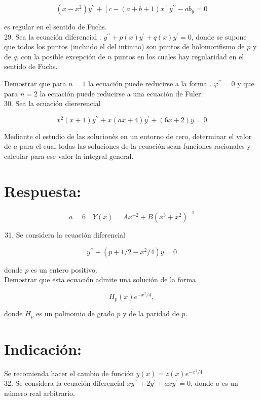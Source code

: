 \documentclass[10pt]{article}
\theoremstyle{plain}
\theoremstyle{definition}
\theoremstyle{remark}
\begin{document}
$$
\left(x-x^{2}\right) y^{\prime \prime}+[c-(a+b+1) x] y^{\prime \prime}-a b_{y}=0
$$

es regular en el sentido de Fuchs.\\
29. Sea la ecuación diferencial . $y^{\prime \prime}+p(x) y^{\prime}+q(x) y^{\prime}=0$, donde se supone que todos los puntos (incluido el del intinito) son puntos de holomorifismo de $p$ y de $q$, con la posible excepción de $n$ puntos en los cuales hay regularidad en el sentido de Fuchs.

Demostrar que para $n=1$ la ecuación puede reducirse a la forma . $\varphi^{\prime \prime}=0$ y que para $n=2$ la ecuación puede reducirse a una ecuación de Fuler.\\
30. Sea la ecuación diererencial

$$
x^{2}(x+1) y^{\prime \prime}+x(a x+4) y^{\prime}+(6 x+2) y=0
$$

Mediante el estudio de las solucionès en un entorno de cero, determinar el valor de $a$ para el cual todas las soluciones de la ecuación sean funciones racionales y calcular para ese valor la integral general.

\section*{Respuesta:}
$$
a=6 \quad Y(x)=A x^{-2}+B\left(x^{3}+x^{2}\right)^{-1}
$$

\begin{enumerate}
  \setcounter{enumi}{30}
  \item Se considera la ecuación diferencial
\end{enumerate}

$$
y^{\prime \prime}+\left(p+1 / 2-x^{2} / 4\right) y=0
$$

donde $p$ es un entero positivo.\\
Demostrar que esta ecuación admite una solución de la forma

$$
H_{p}(x) e^{-x^{2} / 4},
$$

donde $H_{p}$ es un polinomio de grado $p$ y de la paridad de $p$.

\section*{Indicación:}
Se recomienda hacer el cambio de función $y(x)=z(x) e^{-x^{2} / 4}$\\
32. Se considera la ecuación diferencial $x y^{\prime \prime}+2 y^{\prime}+a x y^{\prime}=0$, donde $a$ es un número real arbitrario.
\end{document}
